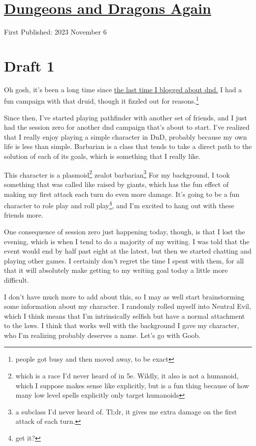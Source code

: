 \documentclass[12pt]{article}[titlepage]
\renewcommand{\,}{\textsuperscript{,}}
\begin{document}
\doublespacing
\section{\href{dungeons-dragons-5.html}{Dungeons and Dragons Again}}
First Published: 2023 November 6

\section{Draft 1}
Oh gosh, it's been a long time since \href{dungeons-dragons-5.html}{the last time I blogged about dnd.}
I had a fun campaign with that druid, though it fizzled out for reasons.\footnote{people got busy and then moved away, to be exact}

Since then, I've started playing pathfinder with another set of friends, and I just had the session zero for another dnd campaign that's about to start.
I've realized that I really enjoy playing a simple character in DnD, probably because my own life is less than simple.
Barbarian is a class that tends to take a direct path to the solution of each of its goals, which is something that I really like.

This character is a plasmoid\footnote{which is a race I'd never heard of in 5e.
Wildly, it also is not a humanoid, which I suppose makes sense like explicitly, but is a fun thing because of how many low level spells explicitly only target humanoids} zealot barbarian\footnote{a subclass I'd never heard of.
Tl;dr, it gives me extra damage on the first attack of each turn.}
For my background, I took something that was called like raised by giants, which has the fun effect of making my first attack each turn do even more damage.
It's going to be a fun character to role play and roll play\footnote{get it?}, and I'm excited to hang out with these friends more.

One consequence of session zero just happening today, though, is that I lost the evening, which is when I tend to do a majority of my writing.
I was told that the event would end by half past eight at the latest, but then we started chatting and playing other games.
I certainly don't regret the time I spent with them, for all that it will absolutely make getting to my writing goal today a little more difficult.

I don't have much more to add about this, so I may as well start brainstorming some information about my character.
I randomly rolled myself into Neutral Evil, which I think means that I'm intrinsically selfish but have a normal attachment to the laws.
I think that works well with the background I gave my character, who I'm realizing probably deserves a name.
Let's go with Goob.
\end{document}
